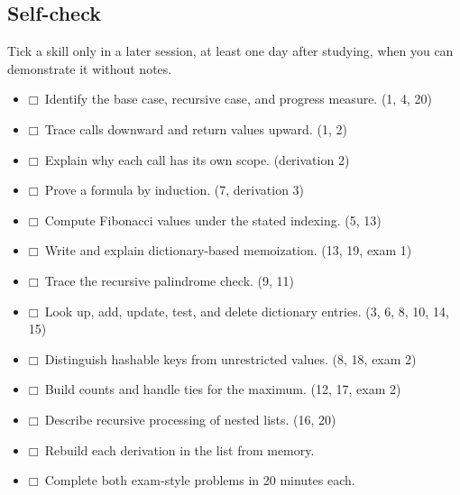 \documentclass[11pt]{article}
\begin{document}
\begin{keepsection}
\section{Self-check}

Tick a skill only in a later session, at least one day after studying, when you can demonstrate it without notes.

\begin{itemize}
\item $\mdlgwhtsquare$\ Identify the base case, recursive case, and progress measure. (1, 4, 20)
\item $\mdlgwhtsquare$\ Trace calls downward and return values upward. (1, 2)
\item $\mdlgwhtsquare$\ Explain why each call has its own scope. (derivation 2)
\item $\mdlgwhtsquare$\ Prove a formula by induction. (7, derivation 3)
\item $\mdlgwhtsquare$\ Compute Fibonacci values under the stated indexing. (5, 13)
\item $\mdlgwhtsquare$\ Write and explain dictionary-based memoization. (13, 19, exam 1)
\item $\mdlgwhtsquare$\ Trace the recursive palindrome check. (9, 11)
\item $\mdlgwhtsquare$\ Look up, add, update, test, and delete dictionary entries. (3, 6, 8, 10, 14, 15)
\item $\mdlgwhtsquare$\ Distinguish hashable keys from unrestricted values. (8, 18, exam 2)
\item $\mdlgwhtsquare$\ Build counts and handle ties for the maximum. (12, 17, exam 2)
\item $\mdlgwhtsquare$\ Describe recursive processing of nested lists. (16, 20)
\item $\mdlgwhtsquare$\ Rebuild each derivation in the list from memory.
\item $\mdlgwhtsquare$\ Complete both exam-style problems in 20 minutes each.
\end{itemize}
\end{keepsection}


\clearpage
\end{document}

